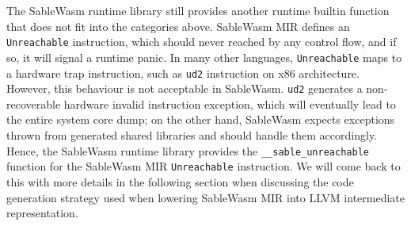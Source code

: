 The SableWasm runtime library still provides another runtime builtin function
that does not fit into the categories above. SableWasm MIR defines an
\texttt{Unreachable} instruction, which should never reached by any control
flow, and if so, it will signal a runtime panic. In many other languages,
\texttt{Unreachable} maps to a hardware trap instruction, such as \texttt{ud2}
instruction on x86 architecture. However, this behaviour is not acceptable in
SableWasm. \texttt{ud2} generates a non-recoverable hardware invalid instruction
exception, which will eventually lead to the entire system core dump; on
the other hand, SableWasm expects exceptions thrown from generated shared
libraries and should handle them accordingly. Hence, the SableWasm runtime
library provides the \texttt{\_\_sable\_unreachable} function for the SableWasm
MIR \texttt{Unreachable} instruction. We will come back to this with more
details in the following section when discussing the code generation strategy
used when lowering SableWasm MIR into LLVM intermediate representation.